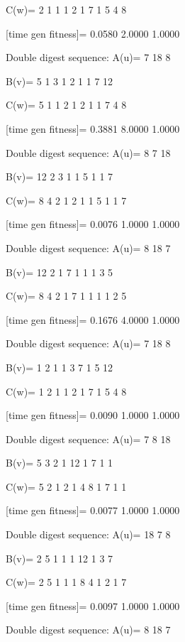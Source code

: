 C(w)=
     2     1     1     1     2     1     7     1     5     4     8

[time gen fitness]=
    0.0580    2.0000    1.0000

Double digest sequence:
A(u)=
     7    18     8

B(v)=
     5     1     3     1     2     1     1     7    12

C(w)=
     5     1     1     2     1     2     1     1     7     4     8

[time gen fitness]=
    0.3881    8.0000    1.0000

Double digest sequence:
A(u)=
     8     7    18

B(v)=
    12     2     3     1     1     5     1     1     7

C(w)=
     8     4     2     1     2     1     1     5     1     1     7

[time gen fitness]=
    0.0076    1.0000    1.0000

Double digest sequence:
A(u)=
     8    18     7

B(v)=
    12     2     1     7     1     1     1     3     5

C(w)=
     8     4     2     1     7     1     1     1     1     2     5

[time gen fitness]=
    0.1676    4.0000    1.0000

Double digest sequence:
A(u)=
     7    18     8

B(v)=
     1     2     1     1     3     7     1     5    12

C(w)=
     1     2     1     1     2     1     7     1     5     4     8

[time gen fitness]=
    0.0090    1.0000    1.0000

Double digest sequence:
A(u)=
     7     8    18

B(v)=
     5     3     2     1    12     1     7     1     1

C(w)=
     5     2     1     2     1     4     8     1     7     1     1

[time gen fitness]=
    0.0077    1.0000    1.0000

Double digest sequence:
A(u)=
    18     7     8

B(v)=
     2     5     1     1     1    12     1     3     7

C(w)=
     2     5     1     1     1     8     4     1     2     1     7

[time gen fitness]=
    0.0097    1.0000    1.0000

Double digest sequence:
A(u)=
     8    18     7

